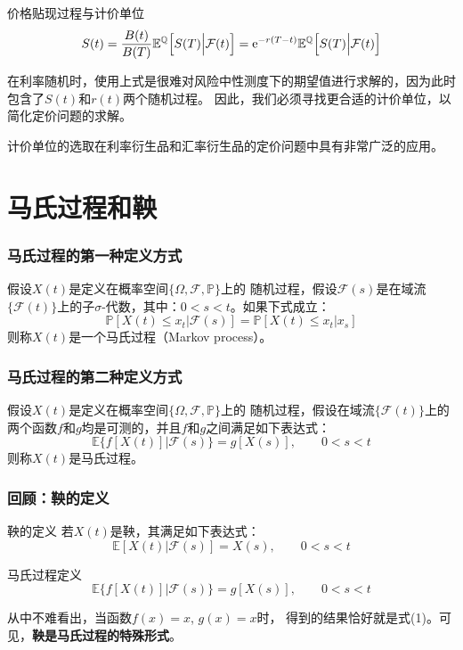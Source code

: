 \documentclass[t]{beamer}
\renewcommand{\Pr}{\mathbb{P}}
\newcommand{\E}{\mathbb{E}}
\newcommand{\EQ}{\mathbb{E}^{\mathbb{Q}}}
\begin{document}
\begin{frame}{价格贴现过程与计价单位}
	\[S(t)=\frac{B(t)}{B(T)}\EQ\Big[S(T)\Big|\mathcal{F}(t)\Big]={\rm e}^{-r(T-t)}\EQ\Big[S(T)\Big|\mathcal{F}(t)\Big]\]

	在利率随机时，使用上式是很难对风险中性测度下的期望值进行求解的，因为此时包含了$S(t)$和$r(t)$两个随机过程。
因此，我们必须寻找更合适的计价单位，以简化定价问题的求解。

计价单位的选取在利率衍生品和汇率衍生品的定价问题中具有非常广泛的应用。
\end{frame}

\section{马氏过程和鞅}

\begin{frame}
	\frametitle{马氏过程的第一种定义方式}
假设$X(t)$是定义在概率空间$\{\Omega, \mathcal{F}, \Pr\}$上的
	随机过程，假设$\mathcal{F}(s)$是在域流$\{\mathcal{F}(t)\}$上的子$\sigma$-代数，其中：$0< s< t$。如果下式成立：
\begin{equation*}
	\Pr[X(t)\le x_t|\mathcal{F}(s)]=\Pr[X(t)\le x_t|x_s]
\end{equation*}
	则称$X(t)$是一个马氏过程（Markov process）。
	

\end{frame}

\begin{frame}
	\frametitle{马氏过程的第二种定义方式}
假设$X(t)$是定义在概率空间$\{\Omega, \mathcal{F}, \Pr\}$上的
随机过程，假设在域流$\{\mathcal{F}(t)\}$上的两个函数$f$和$g$均是可测的，并且$f$和$g$之间满足如下表达式：
\begin{equation*}
	\E\Big\{f[X(t)]\Big| \mathcal{F}(s)\Big\}=g[X(s)],\qquad 0<s<t 
\end{equation*}
则称$X(t)$是马氏过程。
	

\end{frame}

\begin{frame}
	\frametitle{回顾：鞅的定义}
	\begin{block}{鞅的定义}
若$X(t)$是鞅，其满足如下表达式：
\begin{equation}
	\E[X(t)| \mathcal{F}(s)]=X(s),\qquad 0<s<t
\end{equation}	
	\end{block}

\begin{block}{马氏过程定义}
	\begin{equation*}
		\E\Big\{f[X(t)]\Big| \mathcal{F}(s)\Big\}=g[X(s)],\qquad 0<s<t 
	\end{equation*}
\end{block}

从中不难看出，当函数$f(x)=x$, $g(x)=x$时，
得到的结果恰好就是式(1)。可见，\textbf{鞅是马氏过程的特殊形式}。
	

\end{frame}
\end{document}
